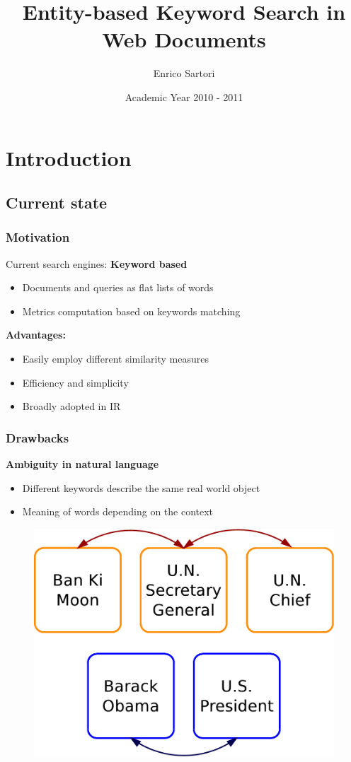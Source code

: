 \documentclass{beamer}
\title{Entity-based Keyword Search in Web Documents}
\author{Enrico Sartori}
\date{Academic Year 2010 - 2011}
\institute{University of Trento}
\begin{document}
\begin{frame}
\titlepage
\end{frame}

\section{Introduction}
\subsection{Current state}

\begin{frame}
\frametitle{Motivation}
Current search engines: {\bfseries Keyword based}
\smallskip
\begin{itemize}
\item Documents and queries as flat lists of words
\item Metrics computation based on keywords matching
\end{itemize}
\bigskip
{\color{red}\bfseries{Advantages:}}\\
\smallskip
\begin{itemize}
\item Easily employ different similarity measures
\item Efficiency and simplicity
\item Broadly adopted in IR
\end{itemize}
\end{frame}

\begin{frame}
\frametitle{Drawbacks}
{\color{red}\bfseries{Ambiguity in natural language}}\\
\smallskip
\begin{itemize}
\item Different keywords describe the same real world object
\item Meaning of words depending on the context
\end{itemize}
\bigskip
\begin{center}
\begin{figure}
\includegraphics[scale=0.4]{imgs/ambiguity}
\end{figure}
\end{center}
\end{frame}
\end{document}
